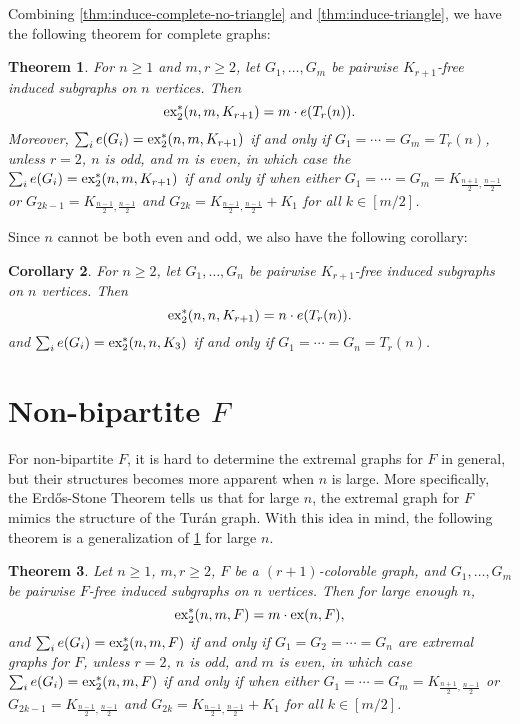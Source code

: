 \documentclass[12pt]{report}
\newtheorem{theorem}{Theorem}[chapter]
\newtheorem{corollary}[theorem]{Corollary}
\newcommand*{\ex}{\textnormal{ex}}
\newcommand*{\dex}{\textnormal{ex}_2}
\begin{document}
Combining \cref{thm:induce-complete-no-triangle} and \cref{thm:induce-triangle}, we have the following theorem for complete graphs:

\begin{theorem}\label{thm:induce-complete}
  For $n \geq 1$ and $m, r \geq 2$, let $G_1, \ldots, G_m$ be pairwise $K_{r + 1}$-free induced subgraphs on $n$ vertices. Then
  \[
    \dex^*(n, m, K_{r + 1}) = m \cdot e(T_r(n)).
  \]
  Moreover, $\sum_i e(G_i) = \dex^*(n, m, K_{r + 1})$ if and only if $G_1 = \cdots = G_m = T_r(n)$, unless $r = 2$, $n$ is odd, and $m$ is even, in which case the $\sum_i e(G_i) = \dex^*(n, m, K_{r + 1})$ if and only if when either $G_1 = \cdots = G_m = K_{\frac{n + 1}{2}, \frac{n - 1}{2}}$ or $G_{2k - 1} = K_{\frac{n - 1}{2}, \frac{n - 1}{2}}$ and $G_{2k} = K_{\frac{n - 1}{2}, \frac{n - 1}{2}} + K_1$ for all $k \in [m/2]$.
\end{theorem}

Since $n$ cannot be both even and odd, we also have the following corollary:

\begin{corollary}\label{cor:induce-complete}
  For $n \geq 2$, let $G_1, \ldots, G_n$ be pairwise $K_{r + 1}$-free induced subgraphs on $n$ vertices. Then
  \[
    \dex^*(n, n, K_{r + 1}) = n \cdot e(T_r(n)).
  \]
  and $\sum_i e(G_i) = \dex^*(n, n, K_3)$ if and only if $G_1 = \cdots = G_n = T_r(n)$.
\end{corollary}

\section{Non-bipartite $F$}

For non-bipartite $F$, it is hard to determine the extremal graphs for $F$ in general, but their structures becomes more apparent when $n$ is large. More specifically, the Erdős-Stone Theorem tells us that for large $n$, the extremal graph for $F$ mimics the structure of the Turán graph. With this idea in mind, the following theorem is a generalization of \cref{thm:induce-complete} for large $n$.

\begin{theorem}
  Let $n \geq 1$, $m, r \geq 2$, $F$ be a $(r + 1)$-colorable graph, and $G_1, \ldots, G_m$ be pairwise $F$-free induced subgraphs on $n$ vertices. Then for large enough $n$,
  \[
    \dex^*(n, m, F) = m \cdot \ex(n, F),
  \]
  and $\sum_i e(G_i) = \dex^*(n, m, F)$ if and only if $G_1 = G_2 = \cdots = G_n$ are extremal graphs for $F$, unless $r = 2$, $n$ is odd, and $m$ is even, in which case $\sum_i e(G_i) = \dex^*(n, m, F)$ if and only if when either $G_1 = \cdots = G_m = K_{\frac{n + 1}{2}, \frac{n - 1}{2}}$ or $G_{2k - 1} = K_{\frac{n - 1}{2}, \frac{n - 1}{2}}$ and $G_{2k} = K_{\frac{n - 1}{2}, \frac{n - 1}{2}} + K_1$ for all $k \in [m/2]$.
\end{theorem}
\end{document}
